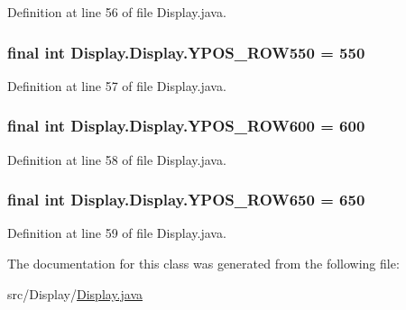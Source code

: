 Definition at line 56 of file Display.\+java.

\hypertarget{class_display_1_1_display_a18e8f506bdeb1ffce18d4e17eacfc1c9}{}
\subsubsection[{Y\+P\+O\+S\+\_\+\+R\+O\+W550}]{\setlength{\rightskip}{0pt plus 5cm}final int Display.\+Display.\+Y\+P\+O\+S\+\_\+\+R\+O\+W550 = 550\hspace{0.3cm}{\ttfamily [static]}}\label{class_display_1_1_display_a18e8f506bdeb1ffce18d4e17eacfc1c9}


Definition at line 57 of file Display.\+java.

\hypertarget{class_display_1_1_display_aeb7358eb4ef9314e129e3636eaee48b2}{}
\subsubsection[{Y\+P\+O\+S\+\_\+\+R\+O\+W600}]{\setlength{\rightskip}{0pt plus 5cm}final int Display.\+Display.\+Y\+P\+O\+S\+\_\+\+R\+O\+W600 = 600\hspace{0.3cm}{\ttfamily [static]}}\label{class_display_1_1_display_aeb7358eb4ef9314e129e3636eaee48b2}


Definition at line 58 of file Display.\+java.

\hypertarget{class_display_1_1_display_a60296fc1277e58422d02f8f462ad95c5}{}
\subsubsection[{Y\+P\+O\+S\+\_\+\+R\+O\+W650}]{\setlength{\rightskip}{0pt plus 5cm}final int Display.\+Display.\+Y\+P\+O\+S\+\_\+\+R\+O\+W650 = 650\hspace{0.3cm}{\ttfamily [static]}}\label{class_display_1_1_display_a60296fc1277e58422d02f8f462ad95c5}


Definition at line 59 of file Display.\+java.



The documentation for this class was generated from the following file\+:\begin{DoxyCompactItemize}
\item 
src/\+Display/\hyperlink{_display_8java}{Display.\+java}\end{DoxyCompactItemize}
